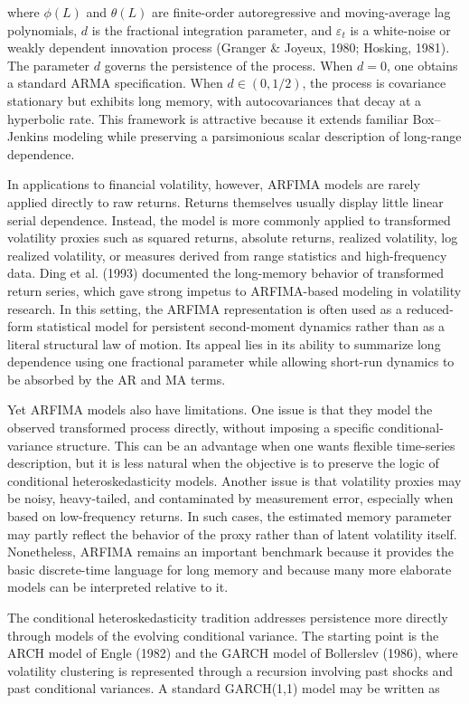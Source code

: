 \documentclass[12pt]{article}
\begin{document}
where $\phi(L)$ and $\theta(L)$ are finite-order autoregressive and moving-average lag polynomials, $d$ is the fractional integration parameter, and $\varepsilon_t$ is a white-noise or weakly dependent innovation process (Granger \& Joyeux, 1980; Hosking, 1981). The parameter $d$ governs the persistence of the process. When $d=0$, one obtains a standard ARMA specification. When $d\in(0,1/2)$, the process is covariance stationary but exhibits long memory, with autocovariances that decay at a hyperbolic rate. This framework is attractive because it extends familiar Box--Jenkins modeling while preserving a parsimonious scalar description of long-range dependence.

In applications to financial volatility, however, ARFIMA models are rarely applied directly to raw returns. Returns themselves usually display little linear serial dependence. Instead, the model is more commonly applied to transformed volatility proxies such as squared returns, absolute returns, realized volatility, log realized volatility, or measures derived from range statistics and high-frequency data. Ding et al. (1993) documented the long-memory behavior of transformed return series, which gave strong impetus to ARFIMA-based modeling in volatility research. In this setting, the ARFIMA representation is often used as a reduced-form statistical model for persistent second-moment dynamics rather than as a literal structural law of motion. Its appeal lies in its ability to summarize long dependence using one fractional parameter while allowing short-run dynamics to be absorbed by the AR and MA terms.

Yet ARFIMA models also have limitations. One issue is that they model the observed transformed process directly, without imposing a specific conditional-variance structure. This can be an advantage when one wants flexible time-series description, but it is less natural when the objective is to preserve the logic of conditional heteroskedasticity models. Another issue is that volatility proxies may be noisy, heavy-tailed, and contaminated by measurement error, especially when based on low-frequency returns. In such cases, the estimated memory parameter may partly reflect the behavior of the proxy rather than of latent volatility itself. Nonetheless, ARFIMA remains an important benchmark because it provides the basic discrete-time language for long memory and because many more elaborate models can be interpreted relative to it.

The conditional heteroskedasticity tradition addresses persistence more directly through models of the evolving conditional variance. The starting point is the ARCH model of Engle (1982) and the GARCH model of Bollerslev (1986), where volatility clustering is represented through a recursion involving past shocks and past conditional variances. A standard GARCH(1,1) model may be written as
\end{document}
